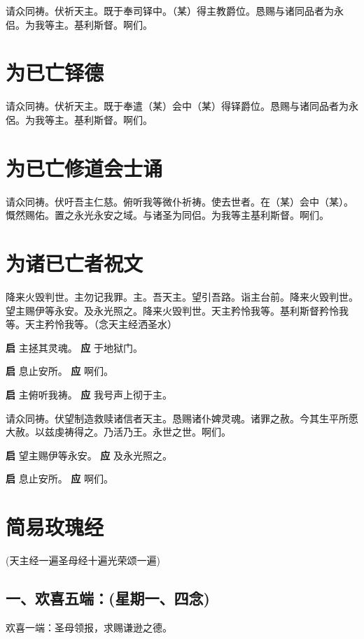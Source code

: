 \documentclass[UTF8,17pt]{ctexart}
\begin{document}
请众同祷。伏祈天主。既于奉司铎中。（某）得主教爵位。恳赐与诸同品者为永侣。为我等主。基利斯督。啊们。

\section{为已亡铎德}

请众同祷。伏祈天主。既于奉遣（某）会中（某）得铎爵位。恳赐与诸同品者为永侶。为我等主。基利斯督。啊们。

\section{为已亡修道会⼠诵}

请众同祷。伏吁吾主仁慈。俯听我等微仆祈祷。使去世者。在（某）会中（某）。慨然赐佑。置之永光永安之域。与诸圣为同侣。为我等主基利斯督。啊们。

\section{为诸已亡者祝⽂}

降来⽕毁判世。主勿记我罪。主。吾天主。望引吾路。诣主台前。降来⽕毁判世。望主赐伊等永安。及永光照之。降来⽕毁判世。天主矜怜我等。基利斯督矜怜我等。天主矜怜我等。（念天主经洒圣水）

\textbf{启} \quad 主拯其灵魂。 \hfill \textbf{应} \quad 于地狱门。

\textbf{启} \quad 息⽌安所。 \hfill \textbf{应} \quad 啊们。

\textbf{启} \quad 主俯听我祷。 \hfill \textbf{应} \quad 我号声上彻于主。

请众同祷。伏望制造救赎诸信者天主。恳赐诸仆婢灵魂。诸罪之赦。今其⽣平所愿⼤赦。以兹虔祷得之。乃活乃王。永世之世。啊们。

\textbf{启} \quad 望主赐伊等永安。 \hfill \textbf{应} \quad 及永光照之。

\textbf{启} \quad 息⽌安所。 \textbf{应} \quad 啊们。

\section{简易玫瑰经}

(天主经⼀遍圣母经⼗遍光荣颂⼀遍)

\subsection{⼀、欢喜五端：(星期⼀、四念)}

欢喜⼀端：圣母领报，求赐谦逊之德。
\end{document}
